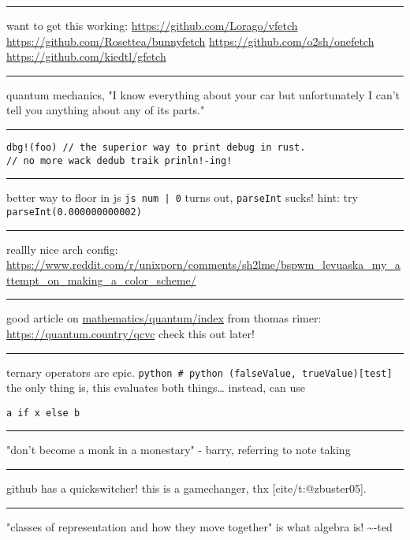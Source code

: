 \documentclass[letterpaper]{article}
\begin{document}
\noindent\rule{\textwidth}{0.5pt}

want to get this working: \url{https://github.com/Lorago/vfetch}
\url{https://github.com/Rosettea/bunnyfetch} \url{https://github.com/o2sh/onefetch}
\url{https://github.com/kiedtl/gfetch}

\noindent\rule{\textwidth}{0.5pt}

quantum mechanics, "I know everything about your car but unfortunately I
can't tell you anything about any of its parts."

\noindent\rule{\textwidth}{0.5pt}

\begin{verbatim}
dbg!(foo) // the superior way to print debug in rust.
// no more wack dedub traik prinln!-ing!
\end{verbatim}

\noindent\rule{\textwidth}{0.5pt}

better way to floor in js \texttt{js num | 0} turns out, \texttt{parseInt} sucks!
hint: try \texttt{parseInt(0.000000000002)}

\noindent\rule{\textwidth}{0.5pt}

reallly nice arch config:
\url{https://www.reddit.com/r/unixporn/comments/sh2lme/bspwm\_levuaska\_my\_attempt\_on\_making\_a\_color\_scheme/}

\noindent\rule{\textwidth}{0.5pt}

good article on
\href{mathematics/quantum/index.org}{mathematics/quantum/index} from
thomas rimer: \url{https://quantum.country/qcvc} check this out later!

\noindent\rule{\textwidth}{0.5pt}

ternary operators are epic.
\texttt{python \# python (falseValue, trueValue)[test]} the only thing is, this
evaluates both things\ldots{} instead, can use

\begin{verbatim}
a if x else b
\end{verbatim}

\noindent\rule{\textwidth}{0.5pt}

"don't become a monk in a monestary" - barry, referring to note taking

\noindent\rule{\textwidth}{0.5pt}

github has a quickswitcher! this is a gamechanger, thx
[cite/t:@zbuster05].

\noindent\rule{\textwidth}{0.5pt}

"classes of representation and how they move together" is what algebra
is! \textasciitilde{}-ted
\end{document}
